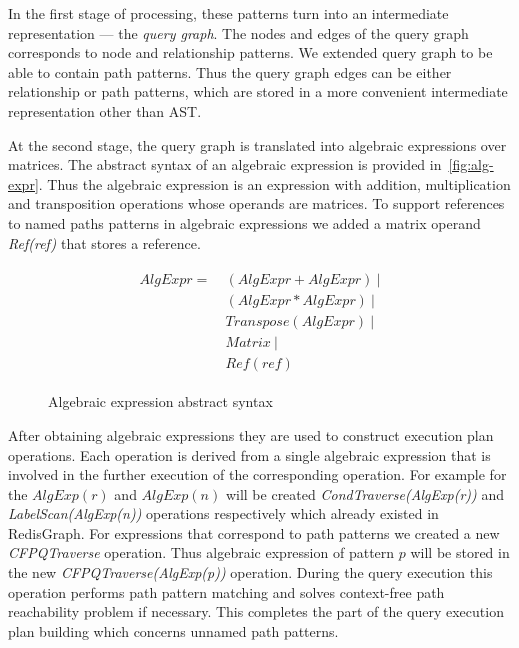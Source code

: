  In the first stage of processing, these patterns turn into an intermediate representation --- the \textit{query graph}. The nodes and edges of the query graph corresponds to node and relationship patterns. We extended query graph to be able to contain path patterns. Thus the query graph edges can be either relationship or path patterns, which are stored in a more convenient intermediate representation other than AST.


At the second stage, the query graph is translated into algebraic expressions over matrices. The abstract syntax of an algebraic expression is provided in~\autoref{fig:alg-expr}. Thus the algebraic expression is an expression with addition, multiplication and transposition operations whose operands are matrices. To support references to named paths patterns in algebraic expressions we added a matrix operand \textit{Ref(ref)} that stores a reference. 


\begin{figure}[H]
\caption{Algebraic expression abstract syntax}
\label{fig:alg-expr}
\begin{align*}
\begin{split}
AlgExpr= ~ &(AlgExpr + AlgExpr)~| \\
           &(AlgExpr * AlgExpr)~| \\
           &Transpose(AlgExpr)~| \\
           &Matrix~| \\
           &Ref(ref)        
\end{split}
\end{align*}
\end{figure}

After obtaining algebraic expressions they are used to construct execution plan operations. Each operation is derived from a single algebraic expression that is involved in the further execution of the corresponding operation. For example for the $AlgExp(r)$ and $AlgExp(n)$ will be created \textit{CondTraverse(AlgExp(r))} and \textit{LabelScan(AlgExp(n))} operations respectively which already existed in RedisGraph. For expressions that correspond to path patterns we created a new \textit{CFPQTraverse} operation. Thus algebraic expression of pattern $p$ will be stored in the new \textit{CFPQTraverse(AlgExp(p))} operation. During the query execution this operation performs path pattern matching and solves context-free path reachability problem if necessary. This completes the part of the query execution plan building which concerns unnamed path patterns.


